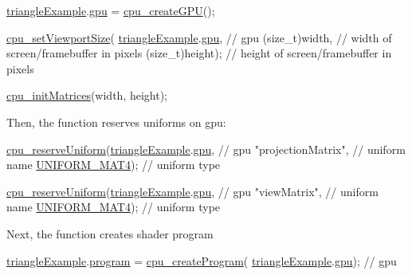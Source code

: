 \begin{DoxyCodeInclude}
  \hyperlink{triangleExample_8c_a235d77635ad30ec86f81d2caabbdc1b5}{triangleExample}.\hyperlink{structTriangleExampleVariables_a6c5c3f82065ae9aac07f9e6f11dd03b3}{gpu} = \hyperlink{gpu_8h_ace6f4308ad5d67c778e48e434f435e7d}{cpu\_createGPU}();

  \hyperlink{gpu_8h_a35867aa85ba3dc4c33d03f6a2842f5af}{cpu\_setViewportSize}(
      \hyperlink{triangleExample_8c_a235d77635ad30ec86f81d2caabbdc1b5}{triangleExample}.\hyperlink{structTriangleExampleVariables_a6c5c3f82065ae9aac07f9e6f11dd03b3}{gpu},  \textcolor{comment}{// gpu}
      (\textcolor{keywordtype}{size\_t})width,        \textcolor{comment}{// width of screen/framebuffer in pixels}
      (\textcolor{keywordtype}{size\_t})height);      \textcolor{comment}{// height of screen/framebuffer in pixels}

  \hyperlink{mouseCamera_8c_a7e7e918a9328502b7c35cfbbdb068b7b}{cpu\_initMatrices}(width, height);
\end{DoxyCodeInclude}
Then, the function reserves uniforms on gpu\-: 
\begin{DoxyCodeInclude}
  \hyperlink{uniforms_8h_acd308bcb7720918cb48f75292a247dfb}{cpu\_reserveUniform}(\hyperlink{triangleExample_8c_a235d77635ad30ec86f81d2caabbdc1b5}{triangleExample}.\hyperlink{structTriangleExampleVariables_a6c5c3f82065ae9aac07f9e6f11dd03b3}{gpu},  \textcolor{comment}{// gpu}
                     \textcolor{stringliteral}{"projectionMatrix"},   \textcolor{comment}{// uniform name}
                     \hyperlink{uniforms_8h_a0d2757b6f370648e2dc98adc54edb97daa3eed90ee47c4ca58597e4115f3557d4}{UNIFORM\_MAT4});        \textcolor{comment}{// uniform type}

  \hyperlink{uniforms_8h_acd308bcb7720918cb48f75292a247dfb}{cpu\_reserveUniform}(\hyperlink{triangleExample_8c_a235d77635ad30ec86f81d2caabbdc1b5}{triangleExample}.\hyperlink{structTriangleExampleVariables_a6c5c3f82065ae9aac07f9e6f11dd03b3}{gpu},  \textcolor{comment}{// gpu}
                     \textcolor{stringliteral}{"viewMatrix"},         \textcolor{comment}{// uniform name}
                     \hyperlink{uniforms_8h_a0d2757b6f370648e2dc98adc54edb97daa3eed90ee47c4ca58597e4115f3557d4}{UNIFORM\_MAT4});        \textcolor{comment}{// uniform type}
\end{DoxyCodeInclude}
Next, the function creates shader program 
\begin{DoxyCodeInclude}
  \hyperlink{triangleExample_8c_a235d77635ad30ec86f81d2caabbdc1b5}{triangleExample}.\hyperlink{structTriangleExampleVariables_aabf788228d2e91e2718facfbd911c8cc}{program} = \hyperlink{program_8h_a4fca7a0e3dac7f93620a1bde6efcde16}{cpu\_createProgram}(
      \hyperlink{triangleExample_8c_a235d77635ad30ec86f81d2caabbdc1b5}{triangleExample}.\hyperlink{structTriangleExampleVariables_a6c5c3f82065ae9aac07f9e6f11dd03b3}{gpu});  \textcolor{comment}{// gpu}
\end{DoxyCodeInclude}
